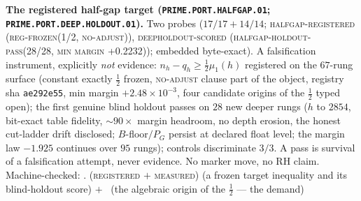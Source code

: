 \par\smallskip\noindent\textbf{The registered half-gap target
(\texttt{PRIME.PORT.\allowbreak HALFGAP.01};
\texttt{PRIME.PORT.DEEP.\allowbreak HOLDOUT.01}).}
Two probes ($17/17 + 14/14$; \textsc{halfgap-registered
(reg-frozen(1/2, no-adjust))}, \textsc{deepholdout-scored
(halfgap-holdout-pass(28/28, min margin +0.2232))}; embedded
byte-exact).  A falsification instrument, explicitly \emph{not}
evidence: $n_h - q_h \ge \tfrac12 \mu_1(h)$ registered on the
$67$-rung surface (constant exactly $\tfrac12$ frozen,
\textsc{no-adjust} clause part of the object, registry sha
\texttt{ae292e55}, min margin $+2.48\times10^{-3}$, four
candidate origins of the $\tfrac12$ typed open); the first
genuine blind holdout passes on $28$ new deeper rungs
($h$ to $2854$, bit-exact table fidelity, ${\sim}90\times$
margin headroom, no depth erosion, the honest cut-ladder drift
disclosed; $B$-floor$/P_G$ persist at declared float level; the
margin law $-1.925$ continues over $95$ rungs); controls
discriminate $3/3$.  A pass is survival of a falsification
attempt, never evidence.  No marker move, no RH claim.
Machine-checked: .
(\textsc{registered $+$ measured}) (a frozen target inequality
and its blind-holdout score) $+$ \mO\ (the algebraic origin of
the $\tfrac12$ --- the demand)
\par\smallskip


